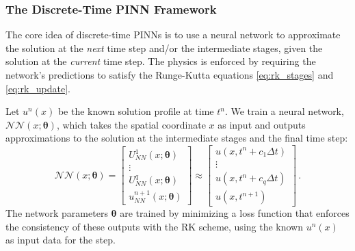 \subsubsection{The Discrete-Time PINN Framework}

The core idea of discrete-time PINNs is to use a neural network to approximate the solution at the \textit{next} time step and/or the intermediate stages, given the solution at the \textit{current} time step. The physics is enforced by requiring the network's predictions to satisfy the Runge-Kutta equations \eqref{eq:rk_stages} and \eqref{eq:rk_update}.

Let $u^n(x)$ be the known solution profile at time $t^n$. We train a neural network, $\mathcal{NN}(x; \boldsymbol{\theta})$, which takes the spatial coordinate $x$ as input and outputs approximations to the solution at the intermediate stages and the final time step:
%
\begin{equation}
\mathcal{NN}(x; \boldsymbol{\theta}) =
\begin{bmatrix}
    U^1_{NN}(x; \boldsymbol{\theta}) \\
    \vdots \\
    U^q_{NN}(x; \boldsymbol{\theta}) \\
    u^{n+1}_{NN}(x; \boldsymbol{\theta})
\end{bmatrix}
\approx
\begin{bmatrix}
    u(x, t^n + c_1 \Delta t) \\
    \vdots \\
    u(x, t^n + c_q \Delta t) \\
    u(x, t^{n+1})
\end{bmatrix}
\,.
\label{eq:dt_pinn_output}
\end{equation}
%
The network parameters $\boldsymbol{\theta}$ are trained by minimizing a loss function that enforces the consistency of these outputs with the RK scheme, using the known $u^n(x)$ as input data for the step.

